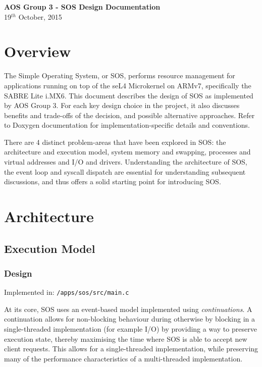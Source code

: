 \documentclass[a4paper,12pt]{article}
\begin{document}
\renewcommand{\headheight}{15pt}
\setlength{\parskip}{\baselineskip}%
\setlength{\parindent}{0pt}%
\begin{center}
  \vspace*{60mm}
  {\Large \bfseries{AOS Group 3 - SOS Design Documentation}}\\[8mm]
  19$^{th}$ October, 2015\\[20mm]
\end{center}
\newpage
\tableofcontents
\newpage
\section{Overview}
The Simple Operating System, or SOS, performs resource management for
applications running on top of the seL4 Microkernel on ARMv7, specifically the
SABRE Lite i.MX6.  This document describes the design of SOS as implemented by
AOS Group 3.  For each key design choice in the project, it also discusses
benefits and trade-offs of the decision, and possible alternative approaches.
Refer to Doxygen documentation for implementation-specific details and
conventions.

There are 4 distinct problem-areas that have been explored in SOS: the
architecture and execution model, system memory and swapping, processes and
virtual addresses and I/O and drivers.  Understanding the architecture of SOS,
the event loop and syscall dispatch are essential for understanding subsequent
discussions, and thus offers a solid starting point for introducing SOS.

\section{Architecture}
\subsection{Execution Model}
\subsubsection{Design}
Implemented in: \texttt{/apps/sos/src/main.c}

At its core, SOS uses an event-based model implemented using
\emph{continuations}.  A continuation allows for non-blocking behaviour during
otherwise by blocking in a single-threaded implementation (for example I/O) by
providing a way to preserve execution state, thereby maximising the time where
SOS is able to accept new client requests.  This allows for a single-threaded
implementation, while preserving many of the performance characteristics of a
multi-threaded implementation.
\end{document}

